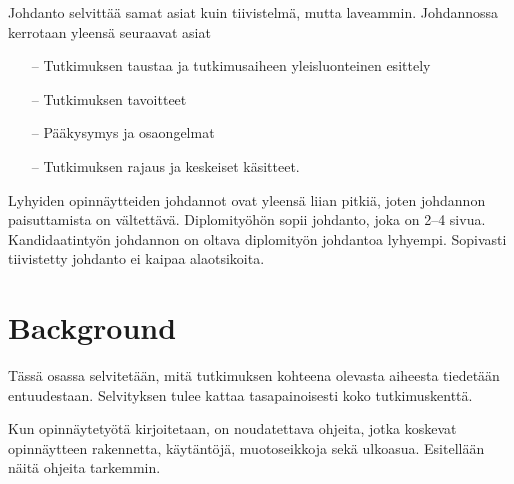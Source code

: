 \documentclass[english, 12pt, a4paper, elec, utf8, a-1b, online]{aaltothesis}
\begin{document}
Johdanto selvitt\"a\"a samat asiat kuin tiivistelm\"a, mutta
laveammin. Johdannossa kerrotaan yleens\"a seuraavat asiat

\begin{itemize}
\item[--]Tutkimuksen taustaa ja tutkimusaiheen yleisluonteinen esittely
\item[--]Tutkimuksen tavoitteet
\item[--]P\"a\"akysymys ja osaongelmat
\item[--]Tutkimuksen rajaus ja keskeiset k\"asitteet.
\end{itemize}

Lyhyiden opinn\"aytteiden johdannot ovat yleens\"a liian pitki\"a, joten
johdannon paisuttamista on v\"altett\"av\"a. Diplomity\"oh\"on sopii johdanto,
joka on 2--4 sivua. %
Kandidaatinty\"on johdannon on oltava diplomity\"on
johdantoa lyhyempi. Sopivasti tiivistetty johdanto ei kaipaa alaotsikoita.


\clearpage

\section{Background}

T\"ass\"a osassa selvitet\"a\"an, mit\"a tutkimuksen kohteena olevasta
aiheesta tiedet\"a\"an entuudestaan. Selvityksen tulee kattaa
tasapainoisesti koko tutkimuskentt\"a. 

Kun opinn\"aytety\"ot\"a kirjoitetaan, on noudatettava 
ohjeita, jotka koskevat opinn\"aytteen rakennetta,
k\"ayt\"ant\"oj\"a, muotoseikkoja sek\"a ulkoasua. Esitell\"a\"an n\"ait\"a
ohjeita tarkemmin.

\end{document}
